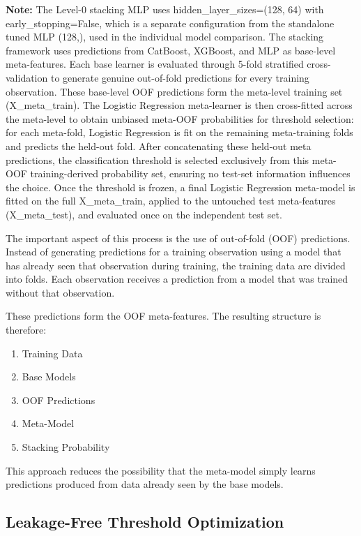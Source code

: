 \documentclass[conference]{IEEEtran}
\begin{document}
\noindent\textbf{Note:} The Level-0 stacking MLP uses \textnormal{hidden\_layer\_sizes=(128, 64)} with \textnormal{early\_stopping=False}, which is a separate configuration from the standalone tuned MLP \textnormal{(128,)}, used in the individual model comparison.
The stacking framework uses predictions from CatBoost, XGBoost, and MLP as base-level meta-features. Each base learner is evaluated through 5-fold stratified cross-validation to generate genuine out-of-fold predictions for every training observation. These base-level OOF predictions form the meta-level training set (\textnormal{X\_meta\_train}). The Logistic Regression meta-learner is then cross-fitted across the meta-level to obtain unbiased meta-OOF probabilities for threshold selection: for each meta-fold, Logistic Regression is fit on the remaining meta-training folds and predicts the held-out fold. After concatenating these held-out meta predictions, the classification threshold is selected exclusively from this meta-OOF training-derived probability set, ensuring no test-set information influences the choice. Once the threshold is frozen, a final Logistic Regression meta-model is fitted on the full \textnormal{X\_meta\_train}, applied to the untouched test meta-features (\textnormal{X\_meta\_test}), and evaluated once on the independent test set.

The important aspect of this process is the use of out-of-fold (OOF) predictions. Instead of generating predictions for a training observation using a model that has already seen that observation during training, the training data are divided into folds. Each observation receives a prediction from a model that was trained without that observation.

These predictions form the OOF meta-features. The resulting structure is therefore:

\begin{enumerate}
    \item Training Data
    \item Base Models
    \item OOF Predictions
    \item Meta-Model
    \item Stacking Probability
\end{enumerate}

This approach reduces the possibility that the meta-model simply learns predictions produced from data already seen by the base models.

\subsection{Leakage-Free Threshold Optimization}
\end{document}
